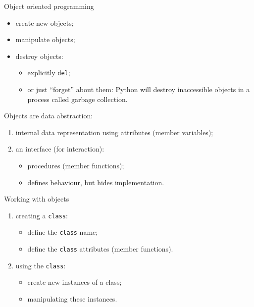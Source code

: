 \documentclass{beamer}
\begin{document}
\begin{frame}{Object oriented programming}
\begin{itemize}
\item \textcolor{pms280_compl}{create} new objects;
\item \textcolor{pms280_compl}{manipulate} objects;
\item \textcolor{pms280_compl}{destroy} objects:
\begin{itemize}
\item explicitly \texttt{del};
\item or just ``forget'' about them: Python will destroy inaccessible
objects in a process called \textcolor{pms280_compl}{garbage collection}.
\end{itemize}
\end{itemize}

Objects are \textcolor{pms280_compl}{data abstraction}:
\begin{enumerate}
\item internal data representation using
\textcolor{pms280_compl}{attributes} (member variables);
\item an interface (for interaction):
\begin{itemize}
\item procedures (member functions);
\item defines behaviour, but hides implementation.
\end{itemize}
\end{enumerate}
\end{frame}

\begin{frame}{Working with objects}
\begin{enumerate}
\item creating a \texttt{class}:
\begin{itemize}
\item define the \texttt{class} name;
\item define the \texttt{class} attributes (member
functions).
\end{itemize}

\item using the \texttt{class}:
\begin{itemize}
\item create new \textcolor{pms280_compl}{instances} of a class;
\item manipulating these instances.
\end{itemize}

\end{enumerate}
\end{frame}
\end{document}
